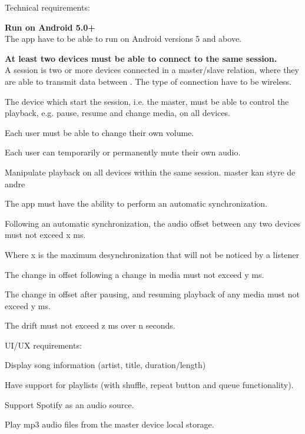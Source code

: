 

Technical requirements:

\begin{eletterate}
    \item \textbf{Run on Android 5.0+} \hfill\\
    The app have to be able to run on Android versions 5 and above.  
    \item \textbf{At least two devices must be able to connect to the same session.} \hfill\\
    A session is two or more devices connected in a master/slave relation,
    where they are able to transmit data between .
    The type of connection have to be wireless.
    \item The device which start the session, i.e. the master, must be able to control the playback, e.g. pause, resume and change media, on all devices. 
    \item Each user must be able to change their own volume.
    \item Each user can temporarily or permanently mute their own audio.
    \item Manipulate playback on all devices within the same session.
    master kan styre de andre
    \item The app must have the ability to perform an automatic synchronization.
    \item Following an automatic synchronization, the audio offset between any two devices must not exceed x ms.
    \item Where x is the maximum desynchronization that will not be noticed by a listener
    \item The change in offset following a change in media must not exceed y ms. 
    \item The change in offset after pausing, and resuming playback of any media must not exceed y ms. 
    \item The drift must not exceed z ms over n seconds. 
\end{eletterate}
UI/UX requirements:
\begin{eletterate}
    \item Display song information (artist, title, duration/length)
    \item Have support for playlists (with shuffle, repeat button and queue functionality).
    \item Support Spotify as an audio source.
    \item Play mp3 audio files from the master device local storage.
\end{eletterate}
